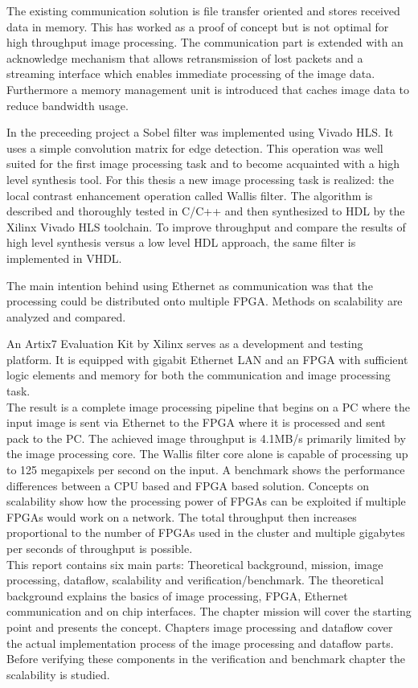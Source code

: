 The existing communication solution is file transfer oriented and stores
received data in memory. This has worked as a proof of concept but is not
optimal
for high throughput image processing. The communication part is extended with an
acknowledge mechanism that allows retransmission of lost packets and a streaming
interface which enables immediate processing of the image data. Furthermore a
memory management unit is introduced that caches image data to reduce bandwidth
usage.

In the preceeding project a Sobel filter was implemented using Vivado HLS. It
uses a simple convolution matrix for edge detection. This operation was well
suited for the first image processing task and to become acquainted with a high
level synthesis tool. For this thesis a new image processing task is realized: the
local contrast enhancement operation called Wallis filter. The algorithm is
described and thoroughly
tested in C/C++ and then synthesized to HDL by the Xilinx Vivado HLS toolchain.
To improve throughput and compare the results of high level synthesis versus a
low level HDL approach, the same filter is implemented in VHDL.

The main intention behind using Ethernet as communication was that the
processing could be distributed onto multiple FPGA. Methods on scalability are
analyzed and compared.

An Artix7 Evaluation Kit by Xilinx serves as a development and testing platform.
It is equipped with gigabit Ethernet LAN and an FPGA with sufficient logic
elements and memory for both the communication and image processing task.
\\

The result is a complete image processing pipeline that begins on a PC where the
input image is sent via Ethernet to the FPGA where it is processed and sent pack
to the PC. The achieved image throughput is 4.1MB/s primarily limited by the image processing core. The Wallis filter core alone
is capable of processing up to 125 megapixels per second on the input. A
benchmark shows the performance differences between a CPU based and FPGA based
solution. 
Concepts on scalability show how the processing power of FPGAs can be
exploited if multiple FPGAs would work on a network. The total throughput then
increases proportional to the number of FPGAs used in the cluster and multiple
gigabytes per seconds of throughput is possible.
\\

This report contains six main parts: Theoretical background, mission,
image processing, dataflow, scalability and verification/benchmark.  The
theoretical background explains
the basics of image processing, FPGA, Ethernet communication and on chip
interfaces. The chapter mission will
cover the starting point and presents the concept. Chapters 
image processing and dataflow cover the actual
implementation process of the image processing and dataflow parts.
Before verifying these components in the verification and benchmark chapter the
scalability is studied.

